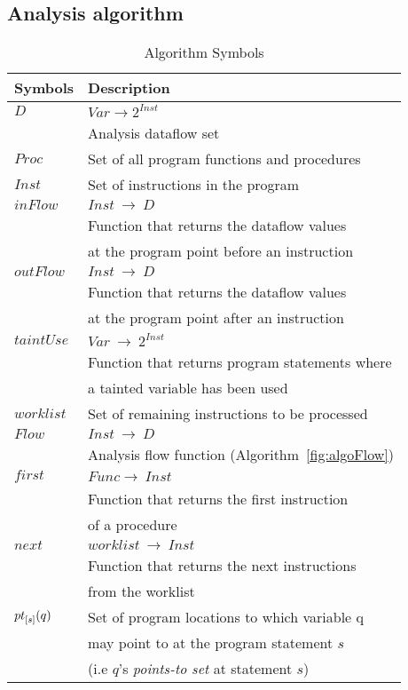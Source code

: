 \subsection{Analysis algorithm} 
\begin{table}
\begin{tabular}{|l|l|}
\hline
\textbf{Symbols}	&	\textbf{Description}							\\ \hline
$\mathit{D}$		&	$\mathit{Var} \rightarrow 2^\mathit{Inst}$		\\
					&	Analysis dataflow set 							\\ \hline
$\mathit{Proc}$		&	Set of all program functions and procedures 	\\ \hline
$\mathit{Inst}$		&	Set of instructions in the program 				\\ \hline
$\mathit{inFlow}$	&	$\mathit{Inst}\ \rightarrow\ \mathit{D}$ 		\\
					&	Function that returns the dataflow values		\\
		    		&	at the program point before an instruction 		\\ 	\hline
$\mathit{outFlow}$	&	$\mathit{Inst}\ \rightarrow\ \mathit{D}$ 		\\
					&	Function that returns the dataflow values		\\
		    		&	at the program point after an instruction 		\\ 	\hline
$\mathit{taintUse}$	&	$\mathit{Var}\ \rightarrow\ 2^{Inst}$ 				\\
					&	Function that returns program statements where	\\
		    		&	a tainted variable has been used	 			\\ 	\hline		    		
$\mathit{worklist}$	&	Set of remaining instructions to be processed 	\\ \hline
$\mathit{Flow}$		&	$\mathit{Inst}\ \rightarrow\ \mathit{D}$ 		\\
					&   Analysis flow function (Algorithm~\ref{fig:algoFlow}) 			\\ \hline
$\mathit{first}$	&	$\mathit{Func} \rightarrow\ \mathit{Inst}$ 		\\
					& 	Function that returns the first instruction		\\
					&	of a procedure									\\ \hline
$\mathit{next}$		&	$\mathit{worklist}\ \rightarrow\ \mathit{Inst}$ \\
					& 	Function that returns the next instructions		\\
					&	from the worklist								\\ \hline
${pt}_{[s]}(q)$	&	Set of program locations to which variable q	\\
					&	may point to at the program statement $s$		\\
					& 	(i.e $q$'s \textit{points-to set} at statement $s$)	\\ \hline					
\end{tabular}
\caption{Algorithm Symbols}\label{symTable}
\end{table}

